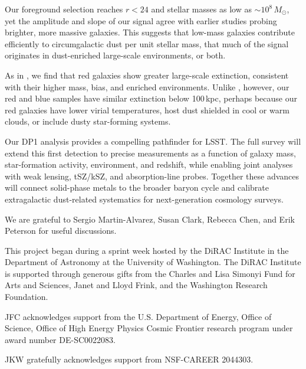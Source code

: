 \documentclass[linenumbers, twocolumn]{aastex701}
\begin{document}
Our foreground selection reaches $r < 24$ and stellar masses as low as $\sim10^8\,M_\odot$, yet the amplitude and slope of our signal agree with earlier studies probing brighter, more massive galaxies.
This suggests that low-mass galaxies contribute efficiently to circumgalactic dust per unit stellar mass, that much of the signal originates in dust-enriched large-scale environments, or both.

As in \citet{mccleary2025}, we find that red galaxies show greater large-scale extinction, consistent with their higher mass, bias, and enriched environments.
Unlike \citet{mccleary2025}, however, our red and blue samples have similar extinction below 100\,kpc, perhaps because our red galaxies have lower virial temperatures, host dust shielded in cool or warm clouds, or include dusty star-forming systems.

Our DP1 analysis provides a compelling pathfinder for LSST.
The full survey will extend this first detection to precise measurements as a function of galaxy mass, star-formation activity, environment, and redshift, while enabling joint analyses with weak lensing, tSZ/kSZ, and absorption-line probes.
Together these advances will connect solid-phase metals to the broader baryon cycle and calibrate extragalactic dust-related systematics for next-generation cosmology surveys.

\begin{acknowledgments}

    We are grateful to Sergio Martin-Alvarez, Susan Clark, Rebecca Chen, and Erik Peterson for useful discussions.

    This project began during a sprint week hosted by the DiRAC Institute in the Department of Astronomy at the University of Washington.
    The DiRAC Institute is supported through generous gifts from the Charles and Lisa Simonyi Fund for Arts and Sciences, Janet and Lloyd Frink, and the Washington Research Foundation.

    JFC acknowledges support from the U.S. Department of Energy, Office of Science, Office of High Energy Physics Cosmic Frontier research program under award number DE-SC0022083.

    JKW gratefully acknowledges support from NSF-CAREER 2044303.

\end{acknowledgments}








\end{document}
